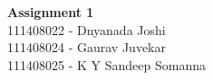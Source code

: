 \documentclass[main.tex]{subfiles}
\begin{document}
\begin{titlepage}

\begin{center}
  \LARGE{\bf{Assignment 1\\}}
  \horrule{0.4pt}
  111408022 - Dnyanada Joshi \\
  111408024 - Gaurav Juvekar \\
  111408025 - K Y Sandeep Somanna \\
\end{center}
\horrule{0.4pt}
\end{titlepage}
\end{document}
